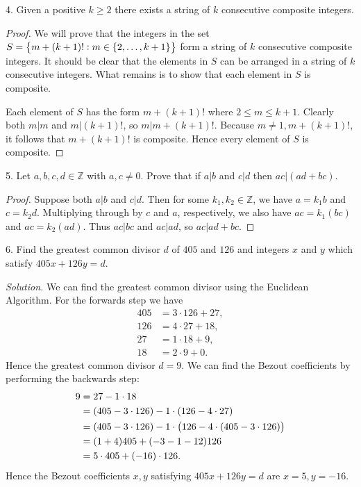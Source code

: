 \documentclass{article}
\newcommand{\Z}{\mathbb{Z}}
\begin{document}
\newpage

4. Given a positive $k \geq 2$ there exists a string of $k$ consecutive
   composite integers.

\begin{proof}

We will prove that the integers in the set $S = \cbr{m + (k + 1)!: m \in
\cbr{2, \ldots, k + 1}}$ form a string of $k$ consecutive composite
integers. It should be clear that the elements in $S$ can be arranged in
a string of $k$ consecutive integers. What remains is to show that each
element in $S$ is composite.

Each element of $S$ has the form $m + (k + 1)!$ where $2 \leq m \leq k +
1$. Clearly both $m|m$ and $m|(k + 1)!$, so $m|m + (k + 1)!$. Because $m
\neq 1, m + (k + 1)!$, it follows that $m + (k + 1)!$ is composite.
Hence every element of $S$ is composite.

\end{proof}

\newpage

5. Let $a, b, c, d \in \Z$ with $a, c \neq 0$. Prove that if $a|b$ and
   $c|d$ then $ac|(ad + bc)$.

\begin{proof}

Suppose both $a|b$ and $c|d$. Then for some $k_1, k_2 \in \Z$, we have
$a = k_1 b$ and $c = k_2 d$. Multiplying through by $c$ and $a$,
respectively, we also have $a c = k_1 (b c)$ and $a c = k_2 (a d)$. Thus
$ac|bc$ and $ac|ad$, so $ac|ad + bc$.

\end{proof}

\newpage

6. Find the greatest common divisor $d$ of $405$ and $126$ and integers
   $x$ and $y$ which satisfy $405x + 126y = d$.

\textit{Solution.}
We can find the greatest common divisor using the Euclidean Algorithm.
For the forwards step we have
%
\begin{align*}
    405 &= 3 \cdot 126 + 27, \\
    126 &= 4 \cdot 27 + 18, \\
    27 &= 1 \cdot 18 + 9, \\
    18 &= 2 \cdot 9 + 0.
\end{align*}
%
Hence the greatest common divisor $d = 9$. We can find the Bezout
coefficients by performing the backwards step:
%
\begin{align*}
    9 &= 27 - 1 \cdot 18 \\
      &= \del{405 - 3 \cdot 126} - 1 \cdot \del{126 - 4 \cdot 27} \\
      &= \del{405 - 3 \cdot 126} - 1 \cdot \del{126 - 4 \cdot \del{405 - 3 \cdot 126}} \\
      &= (1 + 4) 405 + (-3 - 1 - 12) 126 \\
      &= 5 \cdot 405 + (-16) \cdot 126
      .
\end{align*}
%
Hence the Bezout coefficients $x, y$ satisfying $405 x + 126 y = d$ are $x = 5, y = -16$.
\end{document}
